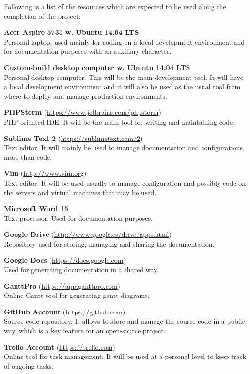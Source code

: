 Following is a list of the resources which are expected to be used along the completion of the project:

\begin{addmargin}[1em]{0em}
\textbf{Acer Aspire 5735 w. Ubuntu 14.04 LTS}\\
Personal laptop, used mainly for coding on a local development environment and for documentation purposes with an auxiliary character.

\textbf{Custom-build desktop computer w. Ubuntu 14.04 LTS}\\
Personal desktop computer. This will be the main development tool. It will have a local development environment and it will also be used as the usual tool from where to deploy and manage production environments.

\textbf{PHPStorm} (\url{https://www.jetbrains.com/phpstorm})\\
PHP oriented IDE. It will be the main tool for writing and maintaining code.

\textbf{Sublime Text 2} (\url{https://sublimetext.com/2})\\
Text editor. It will mainly be used to manage documentation and configurations, more than code.

\textbf{Vim} (\url{http://www.vim.org})\\
Text editor. It will be used usually to manage configuration and possibly code on the servers and virtual machines that may be used.

\textbf{Microsoft Word 15}\\
Text processor. Used for documentation purposes.

\textbf{Google Drive} (\url{http://www.google.es/drive/apps.html})\\
Repository used for storing, managing and sharing the documentation.

\textbf{Google Docs} (\url{https://docs.google.com})\\
Used for generating documentation in a shared way.

\textbf{GanttPro} (\url{https://app.ganttpro.com})\\
Online Gantt tool for generating gantt diagrams.

\textbf{GitHub Account} (\url{https://github.com})\\
Source code repository. It allows to store and manage the source code in a public way, which is a key feature for an open-source project.

\textbf{Trello Account} (\url{https://trello.com})\\
Online tool for task management. It will be used at a personal level to keep track of ongoing tasks.


\end{addmargin}
